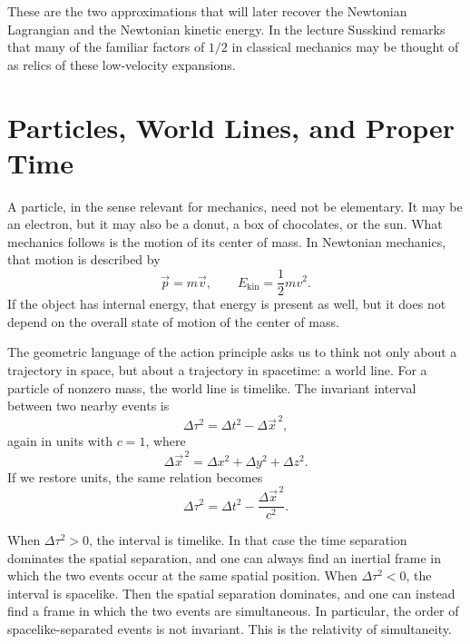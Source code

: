 These are the two approximations that will later recover the Newtonian Lagrangian and the Newtonian kinetic energy. In the lecture Susskind remarks that many of the familiar factors of \(1/2\) in classical mechanics may be thought of as relics of these low-velocity expansions.

\section{Particles, World Lines, and Proper Time}

A particle, in the sense relevant for mechanics, need not be elementary. It may be an electron, but it may also be a donut, a box of chocolates, or the sun. What mechanics follows is the motion of its center of mass. In Newtonian mechanics, that motion is described by
\begin{equation}
\vec p = m\vec v,
\qquad
E_{\text{kin}}=\frac12 mv^2.
\end{equation}
If the object has internal energy, that energy is present as well, but it does not depend on the overall state of motion of the center of mass.

The geometric language of the action principle asks us to think not only about a trajectory in space, but about a trajectory in spacetime: a world line. For a particle of nonzero mass, the world line is timelike. The invariant interval between two nearby events is
\begin{equation}
\Delta\tau^2=\Delta t^2-\Delta\vec x^{\,2},
\end{equation}
again in units with \(c=1\), where
\begin{equation}
\Delta\vec x^{\,2}=\Delta x^2+\Delta y^2+\Delta z^2.
\end{equation}
If we restore units, the same relation becomes
\begin{equation}
\Delta\tau^2=\Delta t^2-\frac{\Delta\vec x^{\,2}}{c^2}.
\end{equation}

When \(\Delta\tau^2>0\), the interval is timelike. In that case the time separation dominates the spatial separation, and one can always find an inertial frame in which the two events occur at the same spatial position. When \(\Delta\tau^2<0\), the interval is spacelike. Then the spatial separation dominates, and one can instead find a frame in which the two events are simultaneous. In particular, the order of spacelike-separated events is not invariant. This is the relativity of simultaneity.

